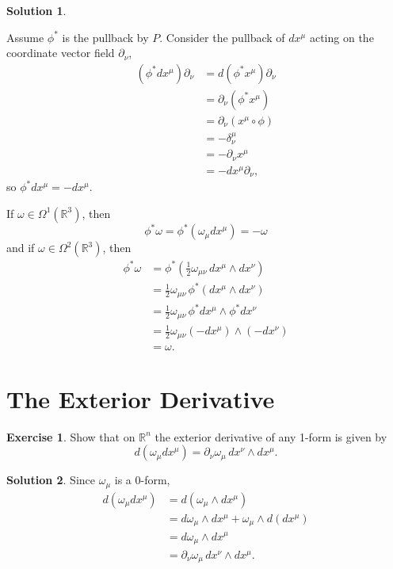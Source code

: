\documentclass[11pt, a4paper]{report}
\theoremstyle{definition}
\newtheorem{ex}{Exercise}[part]
\newtheorem{sol}{Solution}[part]
\begin{document}
\begin{sol}\label{sol:parity1form2form}

Assume $\phi^*$ is the pullback by $P$. Consider the pullback of $dx^\mu$ acting on the coordinate vector field $\partial_\nu$,
\begin{align*}
    (\phi^* dx^\mu) \partial_\nu &= d(\phi^* x^\mu) \partial_\nu \\
        &= \partial_\nu (\phi^* x^\mu) \\
        &= \partial_\nu (x^\mu \circ \phi) \\
        &= -\delta_\nu^\mu \\
        &= -\partial_\nu x^\mu \\
        &= - dx^\mu \partial_\nu,
\end{align*}
so $\phi^* dx^\mu = -dx^\mu$.

If $\omega \in \Omega^1(\mathbb{R}^3)$, then
\[
    \phi^* \omega = \phi^*(\omega_\mu dx^\mu) = -\omega
\]
and if $\omega \in \Omega^2(\mathbb{R}^3)$, then
\begin{align*}
    \phi^* \omega &= \phi^*\left(\tfrac{1}{2}\omega_{\mu\nu} \, dx^\mu \wedge dx^\nu\right) \\
        &= \tfrac{1}{2}\omega_{\mu\nu} \, \phi^*(dx^\mu \wedge dx^\nu) \\
        &= \tfrac{1}{2}\omega_{\mu\nu} \, \phi^* dx^\mu \wedge \phi^* dx^\nu \\
        &= \tfrac{1}{2}\omega_{\mu\nu} (-dx^\mu) \wedge (-dx^\nu) \\
        &= \omega.
\end{align*}

\end{sol}

\section{The Exterior Derivative}

\begin{ex}

Show that on $\mathbb{R}^n$ the exterior derivative of any 1-form is given by
\[
    d(\omega_\mu dx^\mu) = \partial_\nu \omega_\mu \, dx^\nu \wedge dx^\mu.
\]

\end{ex}

\begin{sol}

Since $\omega_\mu$ is a 0-form,
\begin{align*}
    d(\omega_\mu dx^\mu) &= d(\omega_\mu \wedge dx^\mu) \\
        &= d\omega_\mu \wedge dx^\mu + \omega_\mu \wedge d(dx^\mu) \\
        &= d\omega_\mu \wedge dx^\mu \\
        &= \partial_\nu \omega_\mu \, dx^\nu \wedge dx^\mu.
\end{align*}

\end{sol}
\end{document}
